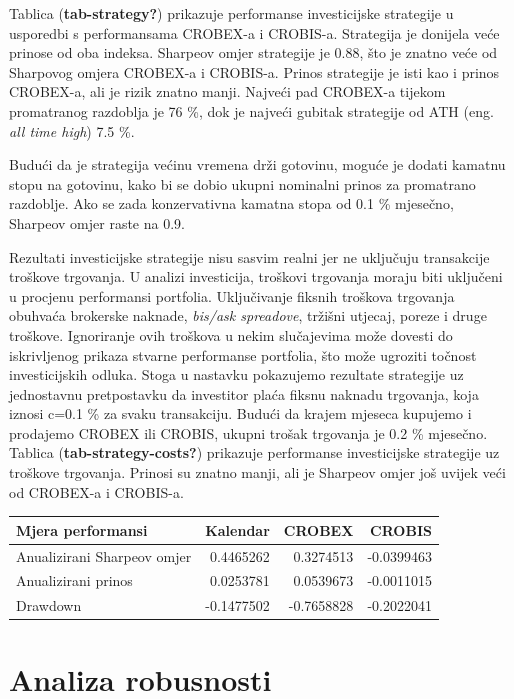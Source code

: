 \documentclass[
  letterpaper,
  DIV=11,
  numbers=noendperiod]{scrartcl}
\begin{document}
Tablica (\textbf{tab-strategy?}) prikazuje performanse investicijske
strategije u usporedbi s performansama CROBEX-a i CROBIS-a. Strategija
je donijela veće prinose od oba indeksa. Sharpeov omjer strategije je
0.88, što je znatno veće od Sharpovog omjera CROBEX-a i CROBIS-a. Prinos
strategije je isti kao i prinos CROBEX-a, ali je rizik znatno manji.
Najveći pad CROBEX-a tijekom promatranog razdoblja je 76 \%, dok je
najveći gubitak strategije od ATH (eng. \emph{all time high}) 7.5 \%.

Budući da je strategija većinu vremena drži gotovinu, moguće je dodati
kamatnu stopu na gotovinu, kako bi se dobio ukupni nominalni prinos za
promatrano razdoblje. Ako se zada konzervativna kamatna stopa od 0.1 \%
mjesečno, Sharpeov omjer raste na 0.9.

Rezultati investicijske strategije nisu sasvim realni jer ne uključuju
transakcije troškove trgovanja. U analizi investicija, troškovi
trgovanja moraju biti uključeni u procjenu performansi portfolia.
Uključivanje fiksnih troškova trgovanja obuhvaća brokerske naknade,
\emph{bis/ask spreadove}, tržišni utjecaj, poreze i druge troškove.
Ignoriranje ovih troškova u nekim slučajevima može dovesti do
iskrivljenog prikaza stvarne performanse portfolia, što može ugroziti
točnost investicijskih odluka. Stoga u nastavku pokazujemo rezultate
strategije uz jednostavnu pretpostavku da investitor plaća fiksnu
naknadu trgovanja, koja iznosi c=0.1 \% za svaku transakciju. Budući da
krajem mjeseca kupujemo i prodajemo CROBEX ili CROBIS, ukupni trošak
trgovanja je 0.2 \% mjesečno. Tablica (\textbf{tab-strategy-costs?})
prikazuje performanse investicijske strategije uz troškove trgovanja.
Prinosi su znatno manji, ali je Sharpeov omjer još uvijek veći od
CROBEX-a i CROBIS-a.

\begin{tabular}[t]{l|r|r|r}
\hline
Mjera performansi & Kalendar & CROBEX & CROBIS\\
\hline
Anualizirani Sharpeov omjer & 0.4465262 & 0.3274513 & -0.0399463\\
\hline
Anualizirani prinos & 0.0253781 & 0.0539673 & -0.0011015\\
\hline
Drawdown & -0.1477502 & -0.7658828 & -0.2022041\\
\hline
\end{tabular}

\section{Analiza robusnosti}\label{analiza-robusnosti}
\end{document}
